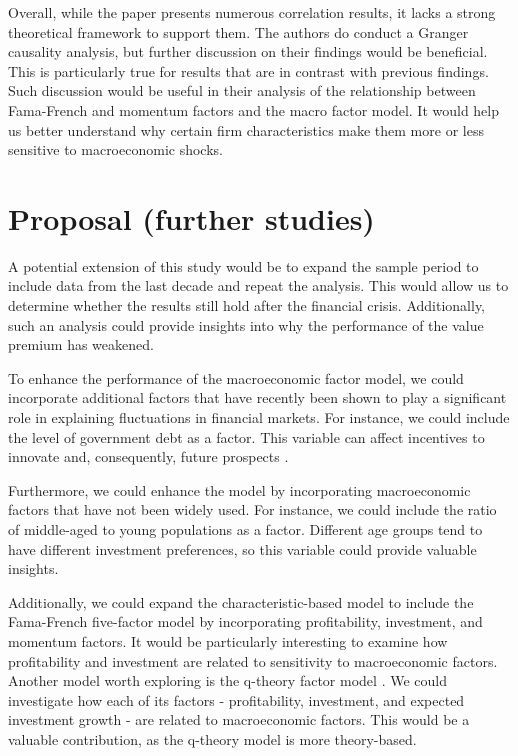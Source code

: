 \documentclass[12pt,a4paper]{ouparticle}
\begin{document}
Overall, while the paper presents numerous correlation results, it lacks a strong theoretical framework to support them. The authors do conduct a Granger causality analysis, but further discussion on their findings would be beneficial. This is particularly true for results that are in contrast with previous findings. Such discussion would be useful in their analysis of the relationship between Fama-French and momentum factors and the macro factor model. It would help us better understand why certain firm characteristics make them more or less sensitive to macroeconomic shocks.
 

\section{Proposal (further studies)}
A potential extension of this study would be to expand the sample period to include data from the last decade and repeat the analysis. This would allow us to determine whether the results still hold after the financial crisis. Additionally, such an analysis could provide insights into why the performance of the value premium has weakened.
 
To enhance the performance of the macroeconomic factor model, we could incorporate additional factors that have recently been shown to play a significant role in explaining fluctuations in financial markets. For instance, we could include the level of government debt as a factor. This variable can affect incentives to innovate and, consequently, future prospects \citep{croce2019government}. 

Furthermore, we could enhance the model by incorporating macroeconomic factors that have not been widely used. For instance, we could include the ratio of middle-aged to young populations as a factor. Different age groups tend to have different investment preferences, so this variable could provide valuable insights.

Additionally, we could expand the characteristic-based model to include the Fama-French five-factor model \citep{fama2015five} by incorporating profitability, investment, and momentum factors. It would be particularly interesting to examine how profitability and investment are related to sensitivity to macroeconomic factors. Another model worth exploring is the q-theory factor model \citep{hou2015digesting,hou2021augmented}. We could investigate how each of its factors - profitability, investment, and expected investment growth - are related to macroeconomic factors. This would be a valuable contribution, as the q-theory model is more theory-based. 





\newpage



\end{document}

